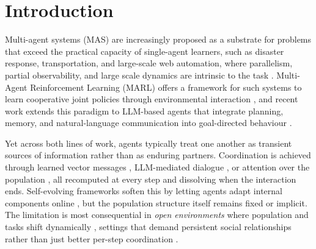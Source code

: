 \documentclass{article}
\theoremstyle{plain}
\theoremstyle{definition}
\theoremstyle{remark}
\begin{document}

\printAffiliationsAndNotice{} 
\begin{abstract}
\end{abstract}

\section{Introduction}
\label{intro}

Multi-agent systems (MAS) are increasingly proposed as a substrate for problems that exceed the practical capacity of single-agent learners, such as disaster response, transportation, and large-scale web automation, where parallelism, partial observability, and large scale dynamics are intrinsic to the task \cite{yuan2023survey, wong2023deep}. Multi-Agent Reinforcement Learning (MARL) offers a framework for such systems to learn cooperative joint policies through environmental interaction \cite{yuan2023survey, oroojlooy2023review}, and recent work extends this paradigm to LLM-based agents that integrate planning, memory, and natural-language communication into goal-directed behaviour \cite{xi2025rise, sun2024llm}.

Yet across both lines of work, agents typically treat one another as transient sources of information rather than as enduring partners. Coordination is achieved through learned vector messages \cite{zhu2024survey}, LLM-mediated dialogue \cite{sun2024llm}, or attention over the population \cite{iqbal2019actor}, all recomputed at every step and dissolving when the interaction ends. Self-evolving frameworks soften this by letting agents adapt internal components online \cite{fang2025comprehensive, gao2025survey}, but the population structure itself remains fixed or implicit. The limitation is most consequential in \emph{open environments} where population and tasks shift dynamically \cite{yuan2023survey}, settings that demand persistent social relationships rather than just better per-step coordination \cite{licua2025mindforge}.
\end{document}
